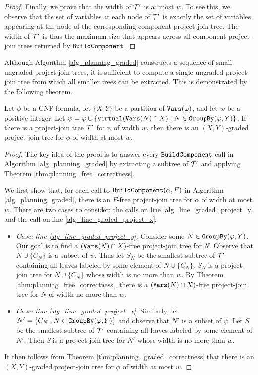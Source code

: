 \begin{proof}
Finally, we prove that the width of $\mathcal{T}'$ is at most $w$. To see this, we observe that the set of variables at each node of $\mathcal{T}'$ is exactly the set of variables appearing at the node of the corresponding component project-join tree. The width of $\mathcal{T}'$ is thus the maximum size that appears across all component project-join trees returned by $\texttt{\upshape BuildComponent}$. 
\end{proof}

Although Algorithm \ref{alg_planning_graded} constructs a sequence of small ungraded project-join trees, it is sufficient to compute a single ungraded project-join tree from which all smaller trees can be extracted. This is demonstrated by the following theorem.
\begin{theorem}
\label{thm:graded_from_virtual}
Let $\phi$ be a CNF formula, let $\{X, Y\}$ be a partition of $\texttt{\upshape Vars}(\varphi)$, and let $w$ be a positive integer. Let $\psi = \varphi \cup \{\texttt{\upshape virtual}(\texttt{\upshape Vars}(N)\cap X) : N \in \texttt{\upshape GroupBy}(\varphi, Y)\}$.
If there is a project-join tree $\mathcal{T}'$ for $\psi$ of width $w$, then there is an $(X,Y)$-graded project-join tree for $\phi$ of width at most $w$.
\end{theorem}
\begin{proof}
The key idea of the proof is to answer every $\texttt{\upshape BuildComponent}$ call in Algorithm \ref{alg_planning_graded} by extracting a subtree of $\mathcal{T}'$ and applying Theorem \ref{thm:planning_free_correctness}.

We first show that, for each call to $\texttt{\upshape BuildComponent}(\alpha, F)$ in Algorithm \ref{alg_planning_graded}, there is an $F$-free project-join tree for $\alpha$ of width at most $w$. There are two cases to consider: the calls on line \ref{alg_line_graded_project_y} and the call on line \ref{alg_line_graded_project_x}.
\begin{itemize}
    \item \textit{Case: line \ref{alg_line_graded_project_y}.} Consider some $N \in \texttt{\upshape GroupBy}(\varphi, Y)$. Our goal is to find a $(\texttt{\upshape Vars}(N) \cap X)$-free project-join tree for $N$. Observe that $N \cup \{C_N\}$ is a subset of $\psi$. Thus let $S_N$ be the smallest subtree of $\mathcal{T}'$ containing all leaves labeled by some element of $N \cup \{C_N\}$. $S_N$ is a project-join tree for $N \cup \{C_N\}$ whose width is no more than $w$. By Theorem  \ref{thm:planning_free_correctness}, there is a $(\texttt{\upshape Vars}(N) \cap X)$-free project-join tree for $N$ of width no more than $w$.
    
    \item \textit{Case: line \ref{alg_line_graded_project_x}.} Similarly, let $N' = \{C_N : N \in \texttt{\upshape GroupBy}(\varphi, Y)\}$ and observe that $N'$ is a subset of $\psi$. Let $S$ be the smallest subtree of $\mathcal{T}'$ containing all leaves labeled by some element of $N'$. Then $S$ is a project-join tree for $N'$ whose width is no more than $w$. 
\end{itemize}

It then follows from Theorem \ref{thm:planning_graded_correctness} that there is an $(X,Y)$-graded project-join tree for $\phi$ of width at most $w$. 
\end{proof}

